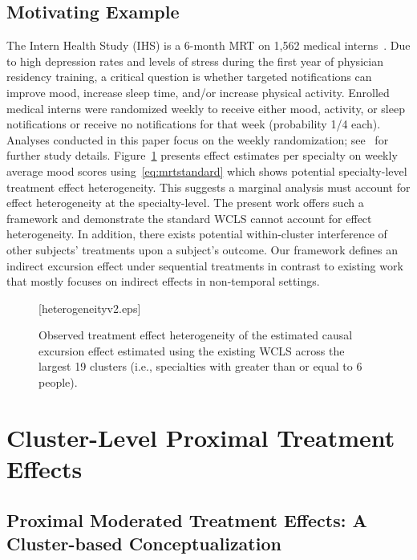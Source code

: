 \documentclass[lineno]{biometrika}
\begin{document}
\subsection{Motivating Example}
\label{section:motex}

The Intern Health Study (IHS) is a 6-month MRT on 1,562 medical interns~\citep{Necamp2020}.  Due to high depression rates and levels of stress during the first year of physician residency training, a critical question is whether targeted notifications can improve mood, increase sleep time, and/or increase physical activity. Enrolled medical interns were randomized weekly to receive either mood, activity, or sleep notifications or receive no notifications for that week (probability 1/4 each).  Analyses conducted in this paper focus on the weekly randomization; see~\cite{Necamp2020} for further study details.  Figure~\ref{fig:wcls_heterogeneity} presents effect estimates per specialty on weekly average mood scores using~\eqref{eq:mrtstandard} which shows potential specialty-level treatment effect heterogeneity.  This suggests a marginal analysis must account for effect heterogeneity at the specialty-level. The present work offers such a framework and demonstrate the standard WCLS cannot account for effect heterogeneity. In addition, there exists potential within-cluster interference of other subjects' treatments upon a subject's outcome. Our framework defines an indirect excursion effect under sequential treatments in contrast to existing work that mostly focuses on indirect effects in non-temporal settings.

\begin{figure}
  \figurebox{10pc}{15pc}{}[heterogeneityv2.eps]
  \caption{Observed treatment effect heterogeneity of the estimated causal excursion effect estimated using the existing WCLS across the largest 19 clusters (i.e., specialties with greater than or equal to 6 people).}
  \label{fig:wcls_heterogeneity}
\end{figure}

\section{Cluster-Level Proximal Treatment Effects}
\label{section:cond_effects}

\subsection{Proximal Moderated Treatment Effects: A Cluster-based Conceptualization}
\label{section:prox_effects_pot_outcome}
\end{document}

